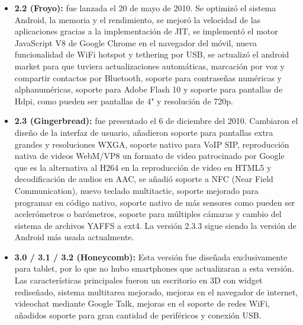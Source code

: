 \begin{itemize}
	\item \textbf{2.2 (Froyo):} fue lanzada el 20 de mayo de 2010. Se optimizó el sistema Android, la memoria y el rendimiento, se mejoró la velocidad de las aplicaciones gracias a la implementación de JIT, se implementó el motor JavaScript V8 de Google Chrome en el navegador del móvil, nueva funcionalidad de WiFi hotspot y tethering por USB, se actualizó el android market para que tuviera actualizaciones automáticas, marcación por voz y compartir contactos por Bluetooth, soporte para contraseñas numéricas y alphanuméricas, soporte para Adobe Flash 10 y soporte para pantallas de Hdpi, como pueden ser pantallas de 4" y resolución de 720p. 

	\item \textbf{2.3 (Gingerbread):} fue presentado el 6 de diciembre del 2010. Cambiaron el diseño de la interfaz de usuario, añadieron soporte para pantallas extra grandes y resoluciones WXGA, soporte nativo para VoIP SIP, reproducción nativa de videos WebM/VP8 un formato de video patrocinado por Google que es la alternativa al H264 en la reproducción de video en HTML5 y decodificación de audios en AAC, se añadió soporte a NFC (Near Field Communication), nuevo teclado multitactic, soporte mejorado para programar en código nativo, soporte nativo de más sensores como pueden ser acelerómetros o barómetros, soporte para múltiples cámaras y cambio del sistema de archivos YAFFS a ext4. La versión 2.3.3 sigue siendo la versión de Android más usada actualmente. 

	\item \textbf{3.0 / 3.1 / 3.2 (Honeycomb):} Esta versión fue diseñada exclusivamente para tablet, por lo que no hubo smartphones que actualizaran a esta versión. Las características principales fueron un escritorio en 3D con widget rediseñado, sistema multitarea mejorado, mejoras en el navegador de internet, videochat mediante Google Talk, mejoras en el soporte de redes WiFi, añadidos soporte para gran cantidad de periféricos y conexión USB.
	

\end{itemize}
